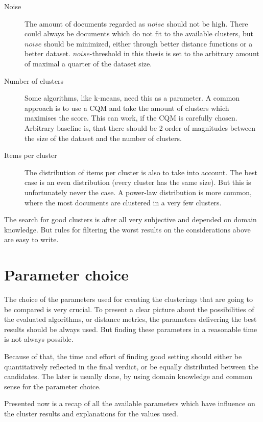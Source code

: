 %
\begin{description}
\item[Noise] The amount of documents regarded as $noise$ should not be high. There could always be documents which do not fit to the available clusters, but $noise$ should be minimized, either through better distance functions or a better dataset. $noise$-threshold in this thesis is set to the arbitrary amount of maximal a quarter of the dataset size.
\item[Number of clusters] Some algorithms, like k-means, need this as a parameter. A common approach is to use a CQM and take the amount of clusters which maximises the score. This can work, if the CQM is carefully chosen. Arbitrary baseline is, that there should be 2 order of magnitudes between the size of the dataset and the number of clusters.
\item[Items per cluster] The distribution of items per cluster is also to take into account. The best case is an even distribution (every cluster has the same size). But this is unfortunately never the case. A power-law distribution is more common, where the most documents are clustered in a very few clusters.
\end{description}
%
The search for good clusters is after all very subjective and depended on domain knowledge. But rules for filtering the worst results on the considerations above are easy to write.

\section{Parameter choice}
The choice of the parameters used for creating the clusterings that are going to be compared is very crucial. To present a clear picture about the possibilities of the evaluated algorithms, or distance metrics, the parameters delivering the best results should be always used. But finding these parameters in a reasonable time is not always possible. 

Because of that, the time and effort of finding good setting should either be quantitatively reflected in the final verdict, or be equally distributed between the candidates. The later is usually done, by using domain knowledge and common sense for the parameter choice.

Presented now is a recap of all the available parameters which have influence on the cluster results and explanations for the values used.

